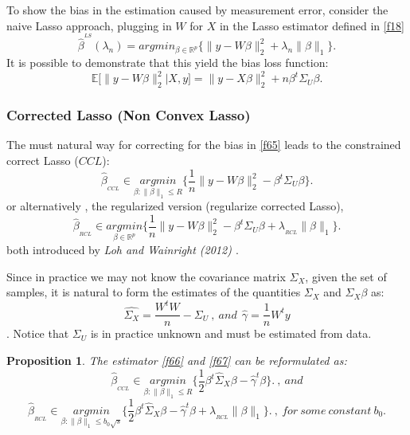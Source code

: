 \documentclass[12pt]{report}
\newtheorem {proposition}{Proposition}[section]  %
\begin{document}
To show the bias in the estimation caused by measurement error, consider the naive Lasso approach, plugging in $W$ for $X$ in the Lasso estimator defined in \eqref{f18}
\begin{equation}
	\hat{\beta}^{^{LS}}(\lambda_{n}) = argmin_{\beta \in \mathbb{R}^{p} } \bigg\{ \parallel y- W\beta \parallel^{2}_{2}+ \lambda_{n}\parallel \beta \parallel_{1}\bigg\}.
	\label{f64}
\end{equation}
It is possible to  demonstrate that this yield the bias loss function:
\begin{equation}
	\mathbb{E}\big[\parallel y- W\beta \parallel^{2}_{2}|X,y\big]=\parallel y- X\beta \parallel^{2}_{2}+n\beta^{t}\Sigma_{U}\beta.
	\label{f65}
\end{equation}
\subsubsection{Corrected Lasso (Non Convex Lasso)}
The must natural way for correcting for the bias in \eqref{f65} leads to the constrained correct Lasso ($CCL$):
\begin{equation}
	\hat{\beta}_{_{CCL}}\in \underset{\beta:\parallel\beta\parallel_{1}\leq R}{argmin}\bigg\{\frac{1}{n}\parallel y- W\beta \parallel^{2}_{2}-\beta^{t}\Sigma_{U}\beta\bigg\}.
	\label{f66}
\end{equation}
or alternatively , the regularized version (regularize corrected Lasso),
\begin{equation}
	\hat{\beta}_{_{RCL}}\in \underset{\beta \in \mathbb{R}^{p}}{argmin}\bigg\{\frac{1}{n}\parallel y- W\beta \parallel^{2}_{2}-\beta^{t}\Sigma_{U}\beta+\lambda_{_{RCL}}\parallel\beta\parallel_{1}\bigg\}.
	\label{f67}
\end{equation}
both introduced by \textit{Loh and Wainright (2012) \cite{nref17}}.

Since in practice we may not know the covariance matrix $\Sigma_{X}$, given the set of samples, it is natural to form the estimates of the quantities $\Sigma_{X}$ and $\Sigma_{X}\beta$ as:$$\hat{\Sigma_{X}}=\frac{W^{t}W}{n}-\Sigma_{U}\ ,\ and\ \ \hat{\gamma}=\frac{1}{n}W^{t}y$$.
Notice that $\Sigma_{U}$ is in practice unknown and must be estimated from data.
\begin{proposition}
	The estimator \eqref{f66} and \eqref{f67} can be reformulated as:
	\begin{equation}
		\hat{\beta}_{_{CCL}}\in \underset{\beta:\parallel\beta\parallel_{1}\leq R}{argmin}\bigg\{\frac{1}{2}\beta^{t}\hat{\Sigma}_{X}\beta-\hat{\gamma}^{t}\beta\bigg\}.\ ,\ and
		\label{f68}
	\end{equation}
	\begin{equation}
		\hat{\beta}_{_{RCL}}\in \underset{\beta:\parallel\beta\parallel_{1}\leq b_{0}\sqrt{s}}{argmin}\bigg\{\frac{1}{2}\beta^{t}\hat{\Sigma}_{X}\beta-\hat{\gamma}^{t}\beta+\lambda_{_{RCL}}\parallel\beta\parallel_{1}\bigg\}.\ ,\ for\ some\ constant\ b_{0} .
		\label{f69}
	\end{equation}
\end{proposition}
\end{document}
